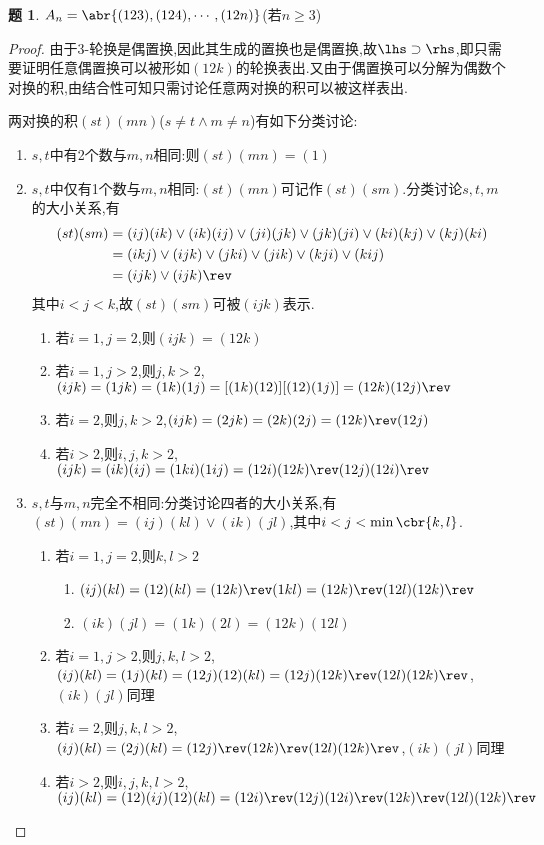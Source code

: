 \documentclass{article}
\theoremstyle{definition}
\newtheorem{exercise}{题}[section]
\begin{document}
\begin{exercise}
    $A_n=\abr{(123),(124),\cdots,(12n)}$(若$n\geq 3$)
\end{exercise}
\begin{proof}
    由于3-轮换是偶置换,因此其生成的置换也是偶置换,故$\lhs \supset \rhs$,即只需要证明任意偶置换可以被形如$(12k)$的轮换表出.又由于偶置换可以分解为偶数个对换的积,由结合性可知只需讨论任意两对换的积可以被这样表出.


    两对换的积$(st)(mn)$($s\neq t\land m\neq n$)有如下分类讨论:
    \begin{enumerate}
        \item $s,t$中有2个数与$m,n$相同:则$(st)(mn)=(1)$
        
        \item $s,t$中仅有1个数与$m,n$相同:$(st)(mn)$可记作$(st)(sm)$.分类讨论$s,t,m$的大小关系,有
        $$\begin{aligned}
        (st)(sm)&=(ij)(ik)\lor (ik)(ij)\lor (ji)(jk)\lor (jk)(ji)\lor (ki)(kj)\lor (kj)(ki)\\
        &=(ikj)\lor (ijk)\lor (jki)\lor (jik)\lor (kji)\lor (kij)\\
        &=(ijk)\lor (ijk)\rev
        \end{aligned}$$
        其中$i<j<k$,故$(st)(sm)$可被$(ijk)$表示.

        \begin{enumerate}
            \item 若$i=1,j=2$,则$(ijk)=(12k)$
            \item 若$i=1,j>2$,则$j,k>2$,$(ijk)=(1jk)=(1k)(1j)=[(1k)(12)][(12)(1j)]=(12k)(12j)\rev$
            \item 若$i=2$,则$j,k>2$,$(ijk)=(2jk)=(2k)(2j)=(12k)\rev (12j)$
            \item 若$i>2$,则$i,j,k>2$,$(ijk)=(ik)(ij)=(1ki)(1ij)=(12i)(12k)\rev (12j)(12i)\rev $
        \end{enumerate}

        \item $s,t$与$m,n$完全不相同:分类讨论四者的大小关系,有$(st)(mn)=(ij)(kl)\lor (ik)(jl)$,其中$i<j<\min\cbr{k,l}$.
        \begin{enumerate}
            \item 若$i=1,j=2$,则$k,l>2$
            \begin{enumerate}
                \item $(ij)(kl)=(12)(kl)=(12k)\rev (1kl)=(12k)\rev (12l)(12k)\rev$
                \item $(ik)(jl)=(1k)(2l)=(12k)(12l)$
            \end{enumerate}
            \item 若$i=1,j>2$,则$j,k,l>2$,$(ij)(kl)=(1j)(kl)=(12j)(12)(kl)=(12j)(12k)\rev (12l)(12k)\rev$,$(ik)(jl)$同理
            \item 若$i=2$,则$j,k,l>2$,$(ij)(kl)=(2j)(kl)=(12j)\rev (12k)\rev (12l)(12k)\rev $,$(ik)(jl)$同理
            \item 若$i>2$,则$i,j,k,l>2$,$(ij)(kl)=(12)(ij)(12)(kl)=(12i)\rev (12j)(12i)\rev (12k)\rev (12l)(12k)\rev$
        \end{enumerate}
    \end{enumerate}
\end{proof}
\end{document}
